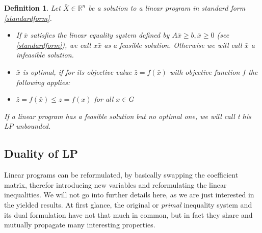 \documentclass[a4paper, 11pt]{article}
\makeatletter
\newtheorem{mydef}{Definition}
\renewenvironment{quotation}
{\list{}{\listparindent=1.5em
		\itemindent=0pt
		\parsep\z@ \@plus\p@}%
	\item\relax}
{\endlist}
\makeatother
\begin{document}
\begin{mydef}
	Let $\bar{X} \in \mathbb{R}^n$ be a solution to a linear program in standard form \ref{standardform}.\\
	\begin{itemize}
		\item[(1)] If $\bar{x}$ satisfies the linear equality system defined by $A\bar{x}\geq b, \bar{x}\geq 0$ (see \ref{standardform}), we call $x\bar{x}$ as a \emph{feasible solution}. Otherwise we will call $\bar{x}$ a infeasible solution.
		\item[(2)] $\bar{x}$ is \emph{optimal}, if for its objective value $\bar{z} = f(\bar{x})$ with objective function $f$ the following applies:
		\begin{quotation}
			$\bar{z} = f(\bar{x}) \leq z = f(x)$ for all $x\in G$
		\end{quotation}
	\end{itemize}
	If a linear program has a feasible solution but no optimal one, we will call t his LP unbounded.
\end{mydef}

\subsection{Duality of LP}
Linear programs can be reformulated, by basically \glqq swapping\grqq{} the coefficient matrix, therefor introducing new variables and reformulating the linear inequalities. We will not go into further details here, as we are just interested in the yielded results. At first glance, the original or \textit{primal} inequality system and its dual formulation have not that much in common, but in fact they share and mutually propagate many interesting properties. \\
\end{document}
